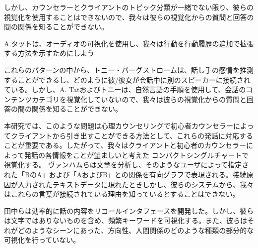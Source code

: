 \documentclass[shuuron]{kuee}
\begin{document}
しかし、カウンセラーとクライアントのトピック分類が一緒でない限り、彼らの視覚化を使用することはできないので、我々は彼らの視覚化からの質問と回答の間の関係を知ることができない。

  A.タット\cite{tat2002visualising}は、オーディオの可視化を使用し、我々は行動を行動履歴の追加で拡張する方法を示すためにしよう

 これらのパターンの中から、トニー・バーグストローム\cite{bergstrom2007seeing}は、話し手の感情を推測することができるし、どのように彼/彼女が会話中に別のスピーカーに接続されている。しかし、A. Tatおよびトニーは、自然言語の手順を使用して、会話のコンテンツカテゴリを視覚化していないので、我々は彼らの視覚化からの質問と回答の間の関係を知ることができない。

  本研究では、このような問題は心理カウンセリングで初心者カウンセラーによってクライアントから引き出すことができる方法として、これらの発話に対応することが重要である。したがって、我々はクライアントと初心者のカウンセラーによって発話の各情報をことが望ましいと考えた コンパクトシングルチャートで視覚化する。
  ヴァンハムら\cite{van2009mapping}は文章を分析し、そのようなユーザによって指定された「BのA」および「AおよびB」との関係を有向グラフで表現される。接続原因が入力されたテキストデータに現れたときしかし、彼らのシステムから、我々はこれらの言葉が接続されている理由を知っているとすることはできない。

  田中ら\cite{tanaka}は効率的に話の内容をリコールインタフェースを開発した。しかし、彼らは文字ではありないものを含め、頻繁キーワードを可視化する。また、彼らはそれがどのようなシーンにあった、方向性、人間関係のどのような種類の部分的な可視化を行っていない。
\end{document}

